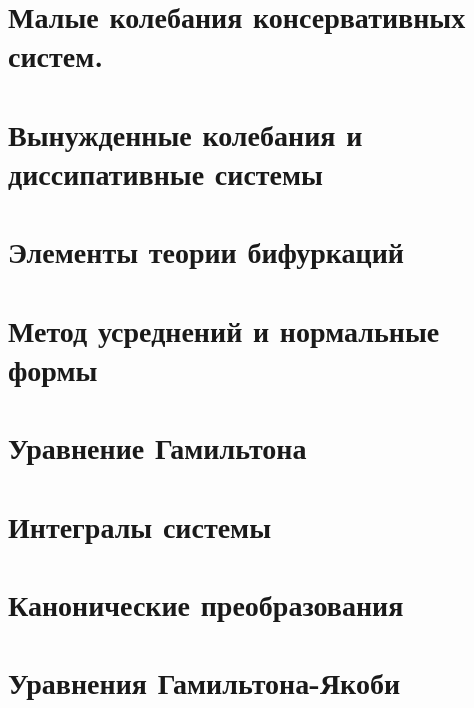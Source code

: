 


\section{Малые колебания консервативных систем.}


\section{Вынужденные колебания и диссипативные системы}


\section{Элементы теории бифуркаций}


\section{Метод усреднений и нормальные формы}


\section{Уравнение Гамильтона}


\section{Интегралы системы}


\section{Канонические преобразования}


\section{Уравнения Гамильтона-Якоби}









   
 



